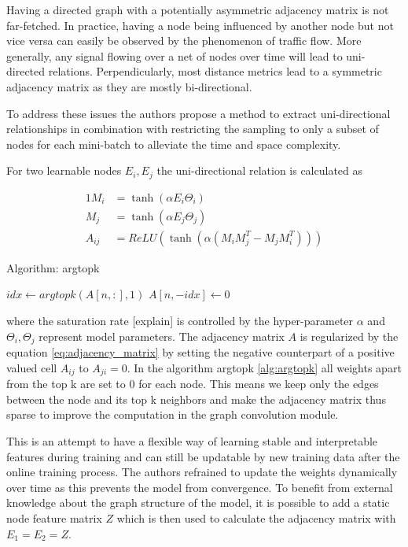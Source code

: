 \documentclass[letterpaper,twocolumn,11pt]{article}
\begin{document}
    Having a directed graph with a potentially asymmetric adjacency matrix is not far-fetched.
    In practice, having a node being influenced by another node but not vice versa can easily be observed by the phenomenon of traffic flow.
    More generally, any signal flowing over a net of nodes over time will lead to uni-directed relations.
    Perpendicularly, most distance metrics lead to a symmetric adjacency matrix as they are mostly bi-directional.

    To address these issues the authors propose a method to extract uni-directional relationships in combination with restricting the sampling
    to only a subset of nodes for each mini-batch to alleviate the time and space complexity.

    For two learnable nodes $E_i, E_j$ the uni-directional relation is calculated as

    \begin{alignat}{1}
        M_i &= \tanh (\alpha E_i \Theta_i) \\
        M_j &= \tanh (\alpha E_j \Theta_j)  \\
        A_{ij} &= ReLU(\tanh (\alpha(M_i M_j^T - M_j M_i^T))) \label{eq:adjacency_matrix}
    \end{alignat}
    \begin{algorithm}
        \caption{Algorithm: argtopk}\label{alg:argtopk}
        \begin{algorithmic}[1]
                \State $idx \gets argtopk(A[n,:], 1)$
                \State $A[n, -idx] \gets 0$
            \EndFor
        \end{algorithmic}
    \end{algorithm}
    where the saturation rate [explain] is controlled by the hyper-parameter $\alpha$ and  $\Theta_i, \Theta_j$ represent
    model parameters. The adjacency matrix $A$ is regularized by the equation \ref{eq:adjacency_matrix}
    by setting the negative counterpart of a positive valued cell $A_{ij}$ to $A_{ji} = 0$. In the algorithm argtopk \ref{alg:argtopk}
    all weights apart from the top k are set to 0 for each node.
    This means we keep only the edges between the node and its top k neighbors and make the adjacency matrix thus sparse to improve the computation in the graph convolution module.

    This is an attempt to have a flexible way of learning stable and interpretable features during training and can still be updatable by new training data after the online training process.
    The authors refrained to update the weights dynamically over time as this prevents the model from convergence.
    To benefit from external knowledge about the graph structure of the model, it is possible to add a static node feature matrix $Z$
    which is then used to calculate the adjacency matrix with $E_1 =  E_2 = Z $.
\end{document}
